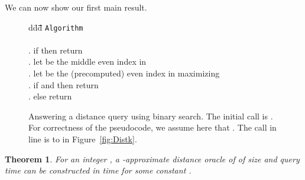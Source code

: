 \documentclass[11pt]{article}
\newtheorem{theorem}{Theorem}
\begin{document}
We can now show our first main result.
\begin{figure}
\begin{tabbing}
d\=dd\=\quad\=\quad\=\quad\=\quad\=\quad\=\quad\=\quad\=\quad\=\quad\=\quad\=\quad\=\kill
\>\texttt{Algorithm} \\\\
. \>if  then return \\
. \>let  be the middle even index in \\
. \>let  be the (precomputed) even index in
        maximizing \\
. \>if  and  then
       return \\
. \>else return 
\end{tabbing}
\caption{Answering a distance query using binary search. The initial call
is . For correctness of the pseudocode, we assume here that . The call in line  is to  in Figure~\ref{fig:Distk}.}\label{fig:BDistk}
\end{figure}
\begin{theorem}\label{Thm:LogkQuery}
For an integer , a -approximate
distance oracle of  of size  and  query time can be constructed in
 time for some constant .
\end{theorem}
\end{document}
